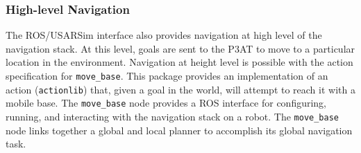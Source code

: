 \subsubsection*{High-level Navigation}
The ROS/USARSim interface also provides navigation at high level of the navigation stack. At this level, goals are sent to the P3AT to move to a particular location in the environment. Navigation at height level is possible with the action specification for \texttt{move\_base}. This package provides an implementation of an action (\texttt{actionlib}) that, given a goal in the world, will attempt to reach it with a mobile base. The \texttt{move\_base} node provides a ROS interface for configuring, running, and interacting with the navigation stack on a robot. The \texttt{move\_base} node links together a global and local planner to accomplish its global navigation task.



